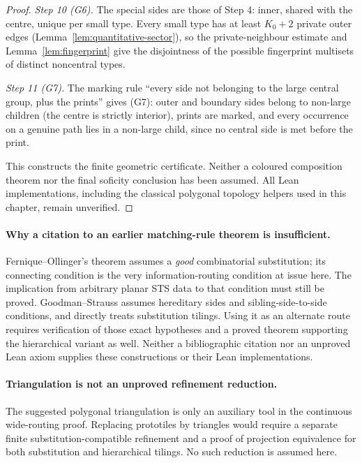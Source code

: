 \begin{proof}
\emph{Step 10 (G6).}  The special sides are those of Step 4: inner, shared
with the centre, unique per small type.  Every small type has at least
$K_0+2$ private outer edges (Lemma~\ref{lem:quantitative-sector}), so the
private-neighbour estimate and Lemma~\ref{lem:fingerprint} give the
disjointness of the possible fingerprint multisets of distinct noncentral
types.

\emph{Step 11 (G7).}  The marking rule ``every side not belonging to the large
central group, plus the prints'' gives (G7): outer and boundary sides belong
to non-large children (the centre is strictly interior), prints are marked,
and every occurrence on a genuine path lies in a non-large child, since no
central side is met before the print.

This constructs the finite geometric certificate.  Neither a coloured
composition theorem nor the final soficity conclusion has been assumed.
All Lean implementations, including the classical polygonal topology
helpers used in this chapter, remain unverified.
\end{proof}

\paragraph{Why a citation to an earlier matching-rule theorem is insufficient.}
Fernique--Ollinger's theorem assumes a \emph{good} combinatorial
substitution; its connecting condition is the very information-routing
condition at issue here.  The implication from arbitrary planar STS data
to that condition must still be proved.  Goodman--Strauss assumes
hereditary sides and sibling-side-to-side conditions, and directly treats
substitution tilings.  Using it as an alternate route requires verification
of those exact hypotheses and a proved theorem supporting the hierarchical
variant as well.  Neither a bibliographic citation nor an unproved Lean
axiom supplies these constructions or their Lean implementations.

\paragraph{Triangulation is not an unproved refinement reduction.}
The suggested polygonal triangulation is only an auxiliary tool in the
continuous wide-routing proof.  Replacing prototiles by triangles would
require a separate finite substitution-compatible refinement and a proof
of projection equivalence for both substitution and hierarchical tilings.
No such reduction is assumed here.
